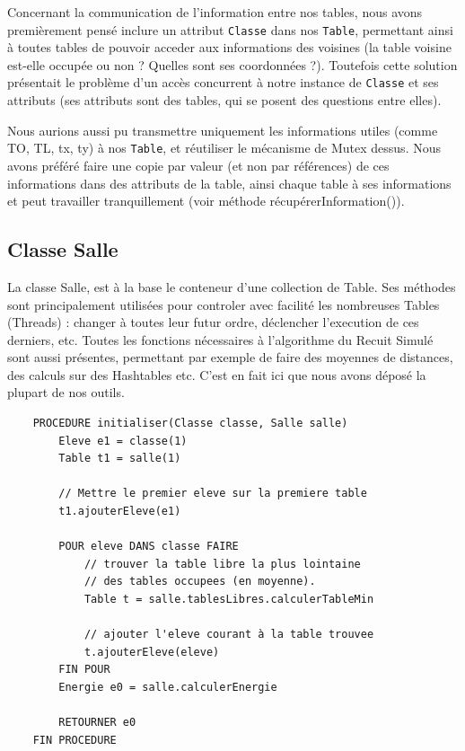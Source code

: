 \documentclass[11pt,a4paper, openany]{book}
\begin{document}
Concernant la communication de l'information entre nos tables, nous avons premièrement pensé inclure un attribut \texttt{Classe} dans nos \texttt{Table}, permettant ainsi à toutes tables de pouvoir acceder aux informations des voisines (la table voisine est-elle occupée ou non ? Quelles sont ses coordonnées ?). Toutefois cette solution présentait le problème d'un accès concurrent à notre instance de \texttt{Classe} et ses attributs (ses attributs sont des tables, qui se posent des questions entre elles).

Nous aurions aussi pu transmettre uniquement les informations utiles (comme TO, TL, tx, ty) à nos \texttt{Table}, et réutiliser le mécanisme de Mutex dessus.
Nous avons préféré faire une copie par valeur (et non par références) de ces informations dans des attributs de la table, ainsi chaque table à ses informations et peut travailler tranquillement (voir méthode récupérerInformation()).

\subsection{Classe Salle}

La classe Salle, est à la base le conteneur d'une collection de Table. Ses méthodes sont principalement utilisées pour controler avec facilité les nombreuses Tables (Threads) : changer à toutes leur futur ordre, déclencher l'execution de ces derniers, etc. Toutes les fonctions nécessaires à l'algorithme du Recuit Simulé sont aussi présentes, permettant par exemple de faire des moyennes de distances, des calculs sur des Hashtables etc. C'est en fait ici que nous avons déposé la plupart de nos outils.

\begin{verbatim}
    PROCEDURE initialiser(Classe classe, Salle salle)
        Eleve e1 = classe(1)
        Table t1 = salle(1)
        
        // Mettre le premier eleve sur la premiere table
        t1.ajouterEleve(e1)
        
        POUR eleve DANS classe FAIRE
        	// trouver la table libre la plus lointaine
        	// des tables occupees (en moyenne).
        	Table t = salle.tablesLibres.calculerTableMin
        
        	// ajouter l'eleve courant à la table trouvee
        	t.ajouterEleve(eleve)
        FIN POUR    
        Energie e0 = salle.calculerEnergie
        
        RETOURNER e0
    FIN PROCEDURE
\end{verbatim}
\end{document}
